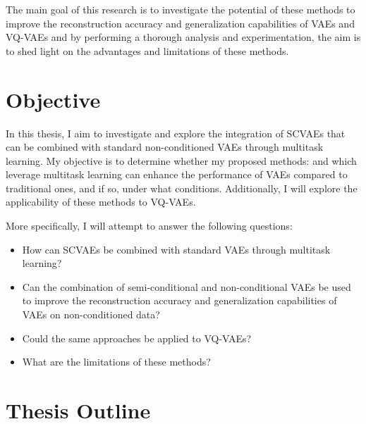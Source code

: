 The main goal of this research is to investigate the potential of these methods to improve the reconstruction accuracy and generalization capabilities of VAEs and VQ-VAEs and by performing a thorough analysis and experimentation, the aim is to shed light on the advantages and limitations of these methods.

\section{Objective}

In this thesis, I aim to investigate and explore the integration of SCVAEs that can be combined with standard non-conditioned VAEs through multitask learning. My objective is to determine whether my proposed methods: and  which leverage multitask learning can enhance the performance of VAEs compared to traditional ones, and if so, under what conditions. Additionally, I will explore the applicability of these methods to VQ-VAEs.

More specifically, I will attempt to answer the following questions:

\begin{itemize}
    \item How can SCVAEs be combined with standard VAEs through multitask learning?
    \item Can the combination of semi-conditional and non-conditional VAEs be used to improve the reconstruction accuracy and generalization capabilities of VAEs on non-conditioned data?
    \item Could the same approaches be applied to VQ-VAEs?
    \item What are the limitations of these methods?

\end{itemize}



\section{Thesis Outline}




